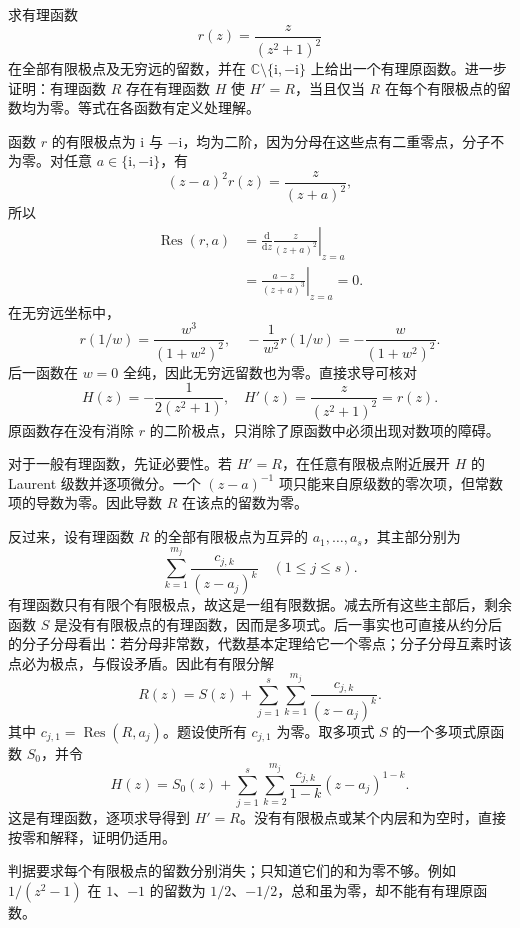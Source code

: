 \begin{exercise}\label{b3:ex:03-7}
求有理函数
\[
  r(z)=\frac{z}{(z^2+1)^2}
\]
在全部有限极点及无穷远的留数，并在
\(\mathbb C\setminus\{\mathrm{i},-\mathrm{i}\}\) 上给出一个有理原函数。进一步证明：有理函数 \(R\) 存在有理函数 \(H\) 使 \(H'=R\)，当且仅当 \(R\) 在每个有限极点的留数均为零。等式在各函数有定义处理解。
\end{exercise}
\begin{solution}
函数 \(r\) 的有限极点为 \(\mathrm{i}\) 与 \(-\mathrm{i}\)，均为二阶，因为分母在这些点有二重零点，分子不为零。对任意 \(a\in\{\mathrm{i},-\mathrm{i}\}\)，有
\[
  (z-a)^2r(z)=\frac{z}{(z+a)^2},
\]
所以
\[
\begin{aligned}
  \operatorname{Res}(r,a)
  &=\left.\frac{\mathrm{d}}{\mathrm{d}z}
                   \frac{z}{(z+a)^2}\right|_{z=a}\\
  &=\left.\frac{a-z}{(z+a)^3}\right|_{z=a}=0.
\end{aligned}
\]
在无穷远坐标中，
\[
  r(1/w)=\frac{w^3}{(1+w^2)^2},
  \quad-\frac1{w^2}r(1/w)=-\frac w{(1+w^2)^2}.
\]
后一函数在 \(w=0\) 全纯，因此无穷远留数也为零。直接求导可核对
\[
  H(z)=-\frac1{2(z^2+1)},
  \quad H'(z)=\frac{z}{(z^2+1)^2}=r(z).
\]
原函数存在没有消除 \(r\) 的二阶极点，只消除了原函数中必须出现对数项的障碍。

对于一般有理函数，先证必要性。若 \(H'=R\)，在任意有限极点附近展开 \(H\) 的 Laurent 级数并逐项微分。一个 \((z-a)^{-1}\) 项只能来自原级数的零次项，但常数项的导数为零。因此导数 \(R\) 在该点的留数为零。

反过来，设有理函数 \(R\) 的全部有限极点为互异的 \(a_1,\ldots,a_s\)，其主部分别为
\[
  \sum_{k=1}^{m_j}\frac{c_{j,k}}{(z-a_j)^k}
  \quad(1\le j\le s).
\]
有理函数只有有限个有限极点，故这是一组有限数据。减去所有这些主部后，剩余函数 \(S\) 是没有有限极点的有理函数，因而是多项式。后一事实也可直接从约分后的分子分母看出：若分母非常数，代数基本定理给它一个零点；分子分母互素时该点必为极点，与假设矛盾。因此有有限分解
\[
  R(z)=S(z)+\sum_{j=1}^{s}\sum_{k=1}^{m_j}
                    \frac{c_{j,k}}{(z-a_j)^k}.
\]
其中 \(c_{j,1}=\operatorname{Res}(R,a_j)\)。题设使所有 \(c_{j,1}\) 为零。取多项式 \(S\) 的一个多项式原函数 \(S_0\)，并令
\[
  H(z)=S_0(z)+\sum_{j=1}^{s}\sum_{k=2}^{m_j}
              \frac{c_{j,k}}{1-k}(z-a_j)^{1-k}.
\]
这是有理函数，逐项求导得到 \(H'=R\)。没有有限极点或某个内层和为空时，直接按零和解释，证明仍适用。

判据要求每个有限极点的留数分别消失；只知道它们的和为零不够。例如 \(1/(z^2-1)\) 在 \(1\)、\(-1\) 的留数为 \(1/2\)、\(-1/2\)，总和虽为零，却不能有有理原函数。
\end{solution}

